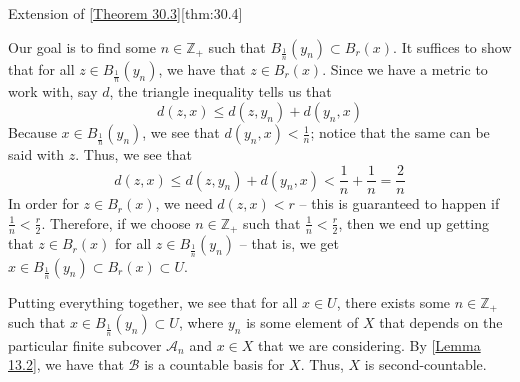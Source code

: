 \begin{thmBox}{Extension of [\hyperlink{thm:30.3}{Theorem 30.3}]}[thm:30.4]
\begin{proofBox}
        Our goal is to find some \( n \in \mathbb{Z}_{ + } \) such that 
        \( B_{ \frac{ 1 }{ n } }( y_{ n } ) \subset B_{ r }( x ) \). 
        It suffices to show that for all \( z \in B_{ \frac{ 1 }{ n } }( y_{ n } ) \), 
        we have that \( z \in B_{ r }( x ) \).
        Since we have a metric to work with, say \( d \), the triangle inequality tells 
        us that
        \begin{equation*}
            d ( z, x )
            \leq 
            d ( z, y_{ n } ) + d ( y_{ n }, x )
        \end{equation*}
        Because \( x \in B_{ \frac{ 1 }{ n } }( y_{ n } ) \), we see that 
        \( d ( y_{ n }, x ) < \frac{ 1 }{ n } \); notice that the same can be said with 
        \( z \).
        Thus, we see that 
        \begin{equation*}
            d ( z, x )
            \leq 
            d ( z, y_{ n } ) + d ( y_{ n }, x ) 
            < 
            \frac{ 1 }{ n } + \frac{ 1 }{ n } = \frac{ 2 }{ n }
        \end{equation*}
        In order for \( z \in B_{ r }( x ) \), we need \( d ( z, x ) < r \) -- this is
        guaranteed to happen if \( \frac{ 1 }{ n } < \frac{ r }{ 2 } \).
        Therefore, if we choose \( n \in \mathbb{Z}_{ + } \) such that 
        \( \frac{ 1 }{ n } < \frac{ r }{ 2 } \), then we end up getting that 
        \( z \in B_{ r }( x ) \) for all \( z \in B_{ \frac{ 1 }{ n } }( y_{ n } ) \) 
        -- that is, we get 
        \( x \in B_{ \frac{ 1 }{ n } }( y_{ n } ) \subset B_{ r }( x ) \subset U \).
    
        \baseSkip
    
        Putting everything together, we see that for all \( x \in U \), there exists 
        some \( n \in \mathbb{Z}_{ + } \) such that 
        \( x \in B_{ \frac{ 1 }{ n } }( y_{ n } ) \subset U \), 
        where \( y_{ n } \) is some element of \( X \) that depends on the particular 
        finite subcover \( \mathcal{A}_{ n } \) and \( x \in X \) that we are 
        considering.
        By [\hyperlink{lem:13.2}{Lemma 13.2}], we have that \( \mathcal{B} \) is a 
        countable basis for \( X \).
        Thus, \( X \) is second-countable.
    \end{proofBox}
\end{thmBox}

